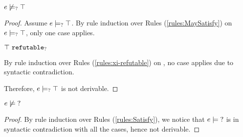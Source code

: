 \begin{lemma}
  \label{lem:no-e-may-satisfy-truth}
  $e \not\models_{?} \top$
\end{lemma}
\begin{proof}
  Assume $e \models_{?} \top$.
  By rule induction over Rules (\ref{rules:MaySatisfy}) on $e \models_{?} \top$, only one case applies.
  \begin{byCases}
  \item[\text{(\ref{rule:CMSNotIntro})}]
    \begin{pfsteps*}
    \item $\top ~\mathtt{refutable}_?$  
    \end{pfsteps*}
    By rule induction over Rules (\ref{rules:xi-refutable}) on , no case applies due to syntactic contradiction.
  \end{byCases}
  Therefore, $e \models_{?} \top$ is not derivable.
  \resetpfcounter
\end{proof}

\begin{lemma}
  \label{lem:no-e-satisfy-unknown}
  $e \not\models \mathtt{?}$
\end{lemma}
\begin{proof}
  By rule induction over Rules (\ref{rules:Satisfy}), we notice that $e \models \mathtt{?}$ is in syntactic contradiction with all the cases, hence not derivable.
\end{proof}

